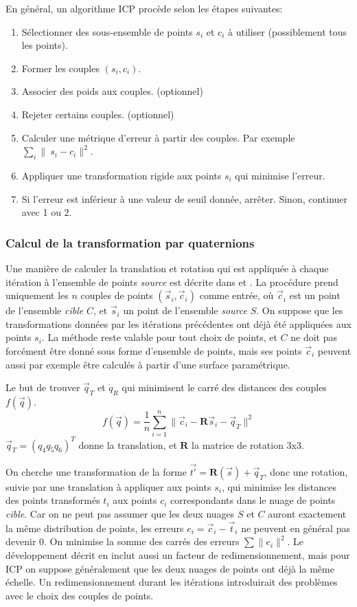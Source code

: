 \documentclass[a4paper,10pt]{scrreprt}
\begin{document}
En général, un algorithme ICP procède selon les étapes suivantes:
\begin{enumerate}
	\item Sélectionner des sous-ensemble de points ${s_i}$ et ${c_i}$ à utiliser (possiblement tous les points).
	\item Former les couples $(s_i, c_i)$.
	\item Associer des poids aux couples. (optionnel)
	\item Rejeter certains couples. (optionnel)
	\item Calculer une métrique d'erreur à partir des couples. Par exemple $\sum_{i} \|\ s_i - c_i \|^2$.
	\item Appliquer une transformation rigide aux points ${s_i}$ qui minimise l'erreur.
	\item Si l'erreur est inférieur à une valeur de seuil donnée, arrêter. Sinon, continuer avec 1 ou 2. 
\end{enumerate}


\subsubsection{Calcul de la transformation par quaternions} \label{sec:quat_trans}
Une manière de calculer la translation et rotation qui est appliquée à chaque itération à l'ensemble de points \emph{source} est décrite dans \cite{Besl1992} et \cite{Horn1986}. La procédure prend uniquement les $n$ couples de points $(\vec{s}_i, \vec{c}_i)$ comme entrée, où $\vec{c}_i$ est un point de l'ensemble \emph{cible} $C$, et $\vec{s}_i$ un point de l'ensemble \emph{source} $S$. On suppose que les transformations données par les itérations précédentes ont déjà été appliquées aux points $s_i$. La méthode reste valable pour tout choix de points, et $C$ ne doit pas forcément être donné sous forme d'ensemble de points, mais ses points $\vec{c}_i$ peuvent aussi par exemple être calculés à partir d'une surface paramétrique.

Le but de trouver $\vec{q}_T$ et $\dot{q}_R$ qui minimisent le carré des distances des couples $f(\vec{q})$.
\begin{equation}
	f(\vec{q}) = \frac{1}{n} \sum_{i=1}^{n} \| \vec{c}_i - \mathbf{R} \vec{s}_i - \vec{q}_T \|^2
\end{equation}
$\vec{q}_T = (q_4 q_5 q_6)^T$ donne la translation, et $\mathbf{R}$ la matrice de rotation 3x3.

On cherche une transformation de la forme $\vec{t'} = \mathbf{R}(\vec{s}) + \vec{q}_T$, donc une rotation, suivie par une translation à appliquer aux points $s_i$, qui minimise les distances des points transformés $t_i$ aux points $c_i$ correspondants dans le nuage de points \emph{cible}. Car on ne peut pas assumer que les deux nuages $S$ et $C$ auront exactement la même distribution de points, les erreurs $e_i = \vec{c}_i - \vec{t}_i$ ne peuvent en général pas devenir $0$. On minimise la somme des carrés des erreurs $\sum \| e_i \|^2$. Le développement décrit en \cite{Horn1986} inclut aussi un facteur de redimensionnement, mais pour ICP on suppose généralement que les deux nuages de points ont déjà la même échelle. Un redimensionnement durant les itérations introduirait des problèmes avec le choix des couples de points.
\end{document}
